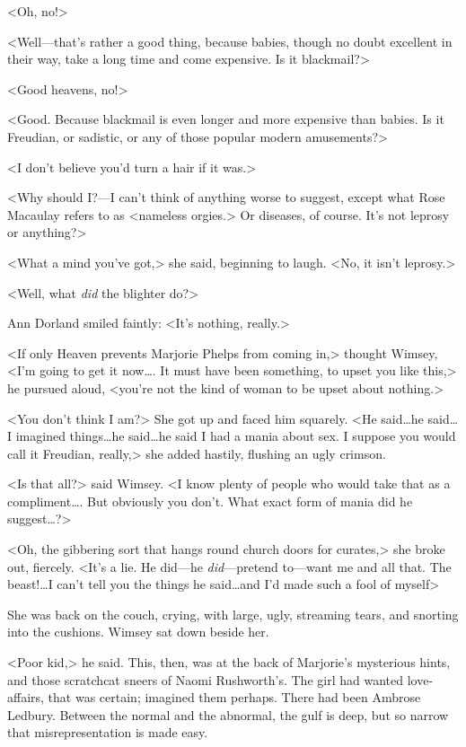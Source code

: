 <Oh, no!>

<Well—that's rather a good thing, because babies, though no doubt excellent in their way, take a long time and come expensive. Is it blackmail?>

<Good heavens, no!>

<Good. Because blackmail is even longer and more expensive than babies. Is it Freudian, or sadistic, or any of those popular modern amusements?>

<I don't believe you'd turn a hair if it was.>

<Why should I\@?—I can't think of anything worse to suggest, except what Rose Macaulay refers to as <nameless orgies.> Or diseases, of course. It's not leprosy or anything?>

<What a mind you've got,> she said, beginning to laugh. <No, it isn't leprosy.>

<Well, what \emph{did} the blighter do?>

Ann Dorland smiled faintly: <It's nothing, really.>

<If only Heaven prevents Marjorie Phelps from coming in,> thought Wimsey, <I'm going to get it now\dots. It must have been something, to upset you like this,> he pursued aloud, <you're not the kind of woman to be upset about nothing.>

<You don't think I am?> She got up and faced him squarely. <He said\dots  he said\dots  I imagined things\dots  he said\dots  he said I had a mania about sex. I suppose you would call it Freudian, really,> she added hastily, flushing an ugly crimson.

<Is that all?> said Wimsey. <I know plenty of people who would take that as a compliment\dots. But obviously you don't. What exact form of mania did he suggest\dots?>

<Oh, the gibbering sort that hangs round church doors for curates,> she broke out, fiercely. <It's a lie. He did—he \emph{did}—pretend to—want me and all that. The beast!\dots I can't tell you the things he said\dots  and I'd made such a fool of myself\longdots>

She was back on the couch, crying, with large, ugly, streaming tears, and snorting into the cushions. Wimsey sat down beside her.

<Poor kid,> he said. This, then, was at the back of Marjorie's mysterious hints, and those scratchcat sneers of Naomi Rushworth's. The girl had wanted love-affairs, that was certain; imagined them perhaps. There had been Ambrose Ledbury. Between the normal and the abnormal, the gulf is deep, but so narrow that misrepresentation is made easy.


